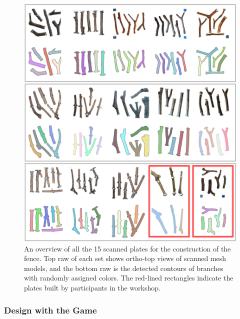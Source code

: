 \begin{figure}[ht]
  \begin{center}
    \includegraphics[width = 0.4\paperwidth]{images/fabrication/all_plates.png}
    \caption{An overview of all the 15 scanned plates for the construction of the fence. Top raw of each set shows ortho-top views of scanned mesh models, and the bottom raw is the detected contours of branches with randomly assigned colors. The red-lined rectangles indicate the plates built by participants in the workshop.}
    \label{fig:scannedplates}
  \end{center}
\end{figure}


\subsubsection*{Design with the Game}


